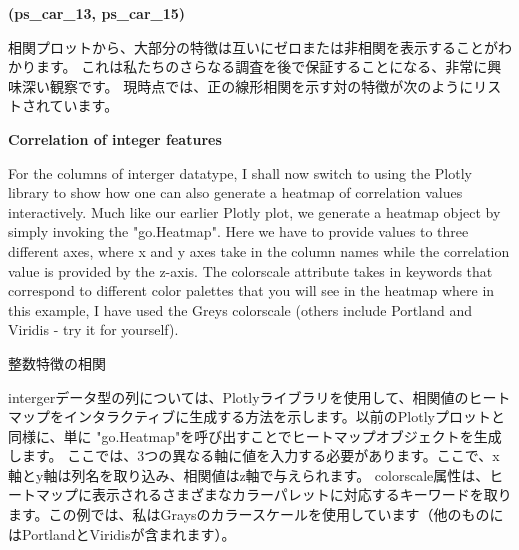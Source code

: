 \documentclass[11pt]{article}
\begin{document}
\textbf{(ps\_car\_13, ps\_car\_15)}

    相関プロットから、大部分の特徴は互いにゼロまたは非相関を表示することがわかります。
これは私たちのさらなる調査を後で保証することになる、非常に興味深い観察です。
現時点では、正の線形相関を示す対の特徴が次のようにリストされています。

    \textbf{Correlation of integer features}

For the columns of interger datatype, I shall now switch to using the
Plotly library to show how one can also generate a heatmap of
correlation values interactively. Much like our earlier Plotly plot, we
generate a heatmap object by simply invoking the "go.Heatmap". Here we
have to provide values to three different axes, where x and y axes take
in the column names while the correlation value is provided by the
z-axis. The colorscale attribute takes in keywords that correspond to
different color palettes that you will see in the heatmap where in this
example, I have used the Greys colorscale (others include Portland and
Viridis - try it for yourself).

    整数特徴の相関

intergerデータ型の列については、Plotlyライブラリを使用して、相関値のヒートマップをインタラクティブに生成する方法を示します。以前のPlotlyプロットと同様に、単に
"go.Heatmap"を呼び出すことでヒートマップオブジェクトを生成します。
ここでは、3つの異なる軸に値を入力する必要があります。ここで、x軸とy軸は列名を取り込み、相関値はz軸で与えられます。
colorscale属性は、ヒートマップに表示されるさまざまなカラーパレットに対応するキーワードを取ります。この例では、私はGraysのカラースケールを使用しています（他のものにはPortlandとViridisが含まれます）。
\end{document}
